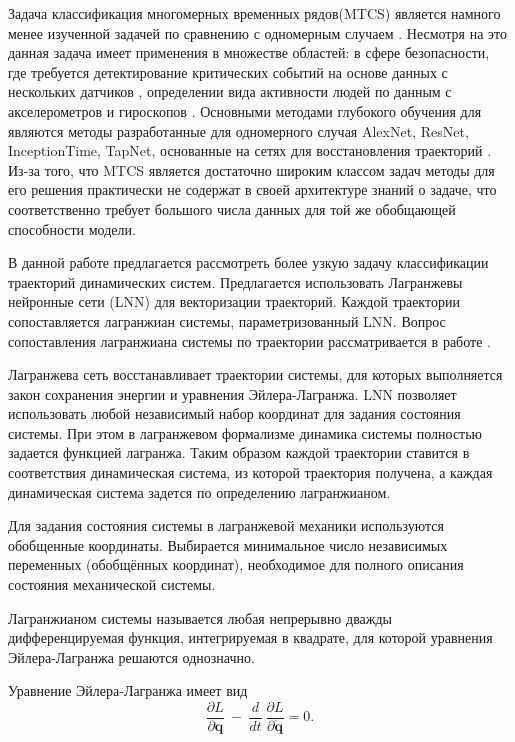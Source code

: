 \documentclass[12pt, twoside]{article}
\begin{document}
Задача классификация многомерных временных рядов(MTCS) является намного менее изученной задачей по сравнению с одномерным случаем \cite{MTCSreview}. Несмотря на это данная задача имеет применения в множестве областей: в сфере безопасности, где требуется детектирование критических событий на основе данных с нескольких датчиков \cite{MTCSindustrial}, определении вида активности людей по данным с акселерометров и гироскопов \cite{MTCSactivity}. Основными методами глубокого обучения для являются методы разработанные для одномерного случая AlexNet, ResNet, InceptionTime, TapNet, основанные на сетях для восстановления траекторий \cite{MTCSreview}. Из-за того, что MTCS является достаточно широким классом задач методы для его решения практически не содержат в своей архитектуре знаний о задаче, что соответственно требует большого числа данных для той же обобщающей способности модели.

В данной работе предлагается рассмотреть более узкую задачу классификации траекторий динамических систем. Предлагается использовать Лагранжевы нейронные сети (LNN) для векторизации траекторий. Каждой траектории сопоставляется лагранжиан системы, параметризованный LNN. Вопрос сопоставления лагранжиана системы по траектории рассматривается  в работе \cite{article}. 

Лагранжева сеть восстанавливает траектории системы, для которых выполняется закон сохранения энергии и уравнения Эйлера-Лагранжа. LNN позволяет использовать любой независимый набор координат для задания состояния системы. При этом в лагранжевом формализме динамика системы полностью задается функцией лагранжа. Таким образом каждой траектории ставится в соответствия динамическая система, из которой траектория получена, а каждая динамическая система задется по определению лагранжианом. 

Для задания состояния системы в лагранжевой механики используются обобщенные координаты.  Выбирается минимальное число независимых переменных (обобщённых координат), необходимое для полного описания состояния механической системы. 

Лагранжианом системы называется любая непрерывно дважды дифференцируемая функция, интегрируемая в квадрате, для которой уравнения Эйлера-Лагранжа решаются однозначно.

Уравнение Эйлера-Лагранжа имеет вид
\begin{equation}
\frac{\partial L}{\partial\mathbf{q}}\ -\ \frac{d}{dt}\ \frac{\partial L}{\partial\dot{\mathbf{q}}}=0. 
\end{equation}
\end{document}
